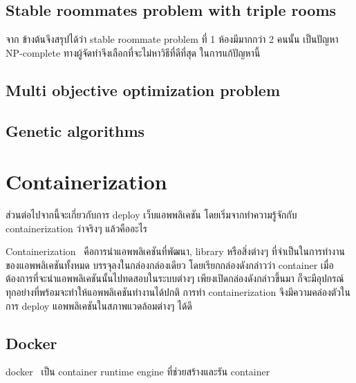 \subsection{Stable roommates problem with triple rooms}
\cite{srpnp}
จาก ข้างต้นจึงสรุปได้ว่า stable roommate problem ที่ 1 ห้องมีมากกว่า 2 คนนั้น
เป็นปัญหา NP-complete ทางผู้จัดทำจึงเลือกที่จะไม่หาวิธีที่ดีที่สุด ในการแก้ปัญหานี้

\subsection{Multi objective optimization problem}

\subsection{Genetic algorithms}

\section{Containerization}
ส่วนต่อไปจากนี้จะเกี่ยวกับการ deploy เว็บแอพพลิเคชัน โดยเริ่มจากทำความรู้จักกับ 
containerization ว่าจริงๆ แล้วคืออะไร

Containerization~\cite{ctnrh} คือการนำแอพพลิเคชันที่พัฒนา, library หรือสิ่งต่างๆ ที่จำเป็นในการทำงานของแอพพลิเคชันทั้งหมด บรรจุลงในกล่องกล่องเดียว โดยเรียกกล่องดังกล่าวว่า container 
เมื่อต้องการที่จะนำแอพพลิเคชันนั้นไปทดสอบในระบบต่างๆ เพียงเปิดกล่องดังกล่าวขึ้นมา
ก็จะมีอุปกรณ์ทุกอย่างที่พร้อมจะทำให้แอพพลิเคชันทำงานได้ปกติ การทำ containerization 
จึงมีความคล่องตัวในการ deploy แอพพลิเคชันในสภาพแวดล้อมต่างๆ ได้ดี 

\subsection{Docker}
docker~\cite{dke} เป็น container runtime engine ที่ช่วยสร้างและรัน container 



